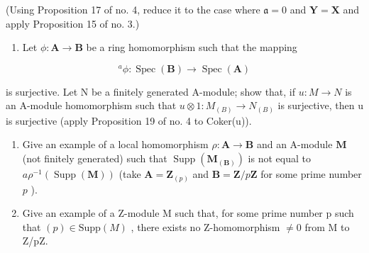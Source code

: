 (Using Proposition 17 of no. 4, reduce it to the case where \(\mathfrak{a} = 0\) and \(\mathbf{Y} = \mathbf{X}\) and apply Proposition 15 of no. 3.)

\begin{enumerate}
\def\labelenumi{\arabic{enumi}.}
\setcounter{enumi}{25}
\tightlist
\item
  Let \(\phi: \mathbf{A} \to \mathbf{B}\) be a ring homomorphism such that the mapping
\end{enumerate}

\[
^ {a} \phi : \operatorname{Spec} (\mathbf {B}) \rightarrow \operatorname{Spec} (\mathbf {A})
\]

is surjective. Let N be a finitely generated A-module; show that, if \(u: M \to N\) is an A-module homomorphism such that \(u \otimes 1: M_{(B)} \to N_{(B)}\) is surjective, then u is surjective (apply Proposition 19 of no. 4 to Coker(u)).

\begin{enumerate}
\def\labelenumi{\arabic{enumi}.}
\setcounter{enumi}{26}
\item
  Give an example of a local homomorphism \(\rho: \mathbf{A} \to \mathbf{B}\) and an A-module \(\mathbf{M}\) (not finitely generated) such that \(\operatorname{Supp}(\mathbf{M}_{(\mathbf{B})})\) is not equal to \(a\rho^{-1}(\operatorname{Supp}(\mathbf{M}))\) (take \(\mathbf{A} = \mathbf{Z}_{(p)}\) and \(\mathbf{B} = \mathbf{Z}/p\mathbf{Z}\) for some prime number \(p\) ).
\item
  Give an example of a Z-module M such that, for some prime number p such that \((p) \in \text{Supp}(M)\) , there exists no Z-homomorphism \(\neq 0\) from M to Z/pZ.
\end{enumerate}

